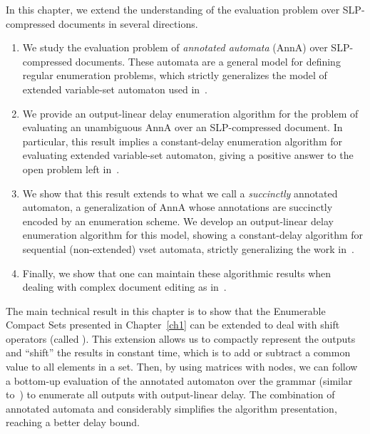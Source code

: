 In this chapter, we extend the understanding of the evaluation problem over SLP-compressed documents in several directions. 
\begin{enumerate}
	\item We study the evaluation problem of \emph{annotated automata} (AnnA) over SLP-compressed documents. These automata are a general model for defining regular enumeration problems, which strictly generalizes the model of extended variable-set automaton used in~\cite{SchmidS21}. 
	\item We provide an output-linear delay enumeration algorithm for the problem of evaluating an unambiguous AnnA over an SLP-compressed document. In particular, this result implies a constant-delay enumeration algorithm for evaluating extended variable-set automaton, giving a positive answer to the open problem left in~\cite{SchmidS21}.
	\item We show that this result extends to what we call a \emph{succinctly} annotated automaton, a generalization of AnnA whose annotations are succinctly encoded by an enumeration scheme. We develop an output-linear delay enumeration algorithm for this model, showing a constant-delay algorithm for sequential  (non-extended) vset automata, strictly generalizing the work in~\cite{SchmidS21}.
	\item Finally, we show that one can maintain these algorithmic results when dealing with complex document editing as in~\cite{SchmidS22}.
\end{enumerate}

The main technical result in this chapter is to show that the Enumerable Compact Sets presented in Chapter~\ref{ch1} can be extended to deal with shift operators (called \dsabbr). This extension allows us to compactly represent the outputs and ``shift'' the results in constant time, which is to add or subtract a common value to all elements in a set. 
Then, by using matrices with \dsabbr nodes, we can follow a bottom-up evaluation of the annotated automaton over the grammar (similar to~\cite{SchmidS21}) to enumerate all outputs with output-linear delay. The combination of annotated automata and \dsabbrs considerably simplifies the algorithm presentation, reaching a better delay bound.
